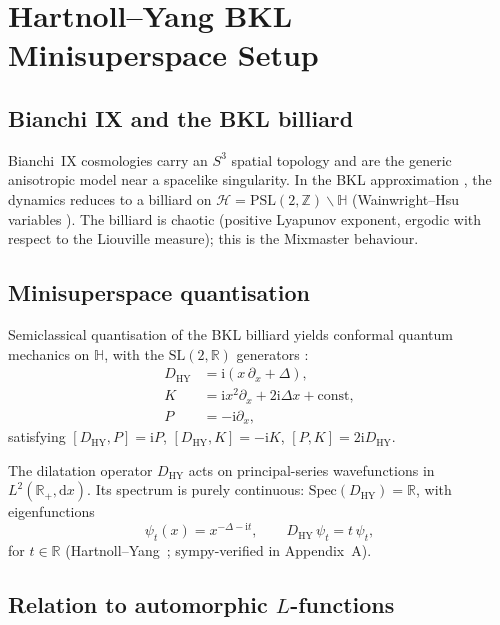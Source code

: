 \documentclass[11pt]{article}
\newcommand{\HY}{\mathrm{HY}}
\newcommand{\PSL}{\mathrm{PSL}}
\newcommand{\SL}{\mathrm{SL}}
\newcommand{\Spec}{\mathrm{Spec}}
\newcommand{\dd}{\mathrm{d}}
\newcommand{\ii}{\mathrm{i}}
\newcommand{\Del}{\Delta}
\begin{document}
\section{Hartnoll--Yang BKL Minisuperspace Setup}
\label{sec:HY}

\subsection{Bianchi IX and the BKL billiard}

Bianchi~IX cosmologies carry an $S^3$ spatial topology and are the
generic anisotropic model near a spacelike singularity. In the BKL
approximation \cite{BKL1970,Misner1969}, the dynamics reduces to a
billiard on $\mathcal{H} = \PSL(2,\mathbb{Z})\backslash\mathbb{H}$
(Wainwright--Hsu variables \cite{WH1989}). The billiard is chaotic
(positive Lyapunov exponent, ergodic with respect to the Liouville
measure); this is the Mixmaster behaviour.

\subsection{Minisuperspace quantisation}

Semiclassical quantisation of the BKL billiard yields conformal quantum
mechanics on $\mathbb{H}$, with the $\SL(2,\mathbb{R})$
generators \cite[Section 4]{HY2025}:
\begin{align}
  D_\HY &= \ii\!\left(x\,\partial_x + \Del\right),
  \label{eq:D-HY}\\
  K &= \ii x^2\partial_x + 2\ii\Del x + \text{const},
  \label{eq:K-HY}\\
  P &= -\ii\partial_x,
  \label{eq:P-HY}
\end{align}
satisfying $[D_\HY, P] = \ii P$, $[D_\HY, K] = -\ii K$, $[P,K] =
2\ii D_\HY$.

The dilatation operator $D_\HY$ acts on principal-series wavefunctions
in $L^2(\mathbb{R}_+, \dd x)$. Its spectrum is purely continuous:
$\Spec(D_\HY) = \mathbb{R}$, with eigenfunctions
\begin{equation}
  \psi_t(x) = x^{-\Del - \ii t}, \qquad D_\HY\,\psi_t = t\,\psi_t,
  \label{eq:HY-eigen}
\end{equation}
for $t \in \mathbb{R}$ (Hartnoll--Yang~\cite[eq.~(43)]{HY2025}; sympy-verified in
Appendix~A).

\subsection{Relation to automorphic $L$-functions}
\end{document}
